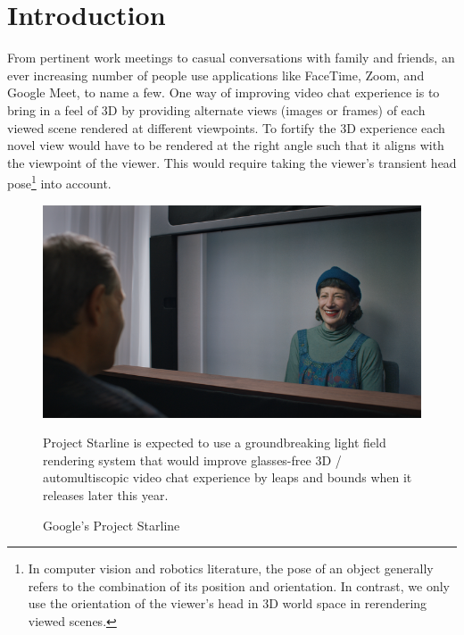 \chapter{Introduction}\label{ch1:introduction}
 
From pertinent work meetings to casual conversations with family and friends, an ever increasing number of people use applications like FaceTime, Zoom, and Google Meet, to name a few. One way of improving video chat experience is to bring in a feel of 3D by providing alternate views (images or frames) of each viewed scene rendered at different viewpoints. To fortify the 3D experience each novel view would have to be rendered at the right angle such that it aligns with the viewpoint of the viewer. This would require taking the viewer's transient head pose\footnote{In computer vision and robotics literature, the pose of an object generally refers to the combination of its position and orientation. In contrast, we only use the orientation of the viewer's head in 3D world space in rerendering viewed scenes.} into account.

\begin{figure}[!h]
    \includegraphics[width=1\columnwidth]{figures/google-starline-416.png}
    \caption{Google's Project Starline}
    \label{fig:google-starline}
    {\small Project Starline is expected to use a groundbreaking light field rendering system that would improve glasses-free 3D / automultiscopic video chat experience by leaps and bounds when it releases later this year.}
\end{figure}

